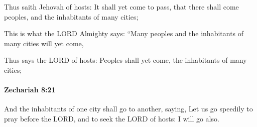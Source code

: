 			\begin{versebox}
					\item[BHS] 
					\item[LXX] 
					\item[ASV] Thus saith Jehovah of hosts: It shall yet come to pass, that there shall come peoples, and the inhabitants of many cities;
					\item[NIV] This is what the LORD Almighty says: “Many peoples and the inhabitants of many cities will yet come,
					\item[NRSV] Thus says the LORD of hosts: Peoples shall yet come, the inhabitants of many cities;
			\end{versebox}

		\paragraph{Zechariah 8:21} %
			\label{ZECHARIAH-8-21}

			And the inhabitants of one city shall go to another, saying, Let us go speedily to pray before the LORD, and to seek the LORD of hosts: I will go also.

